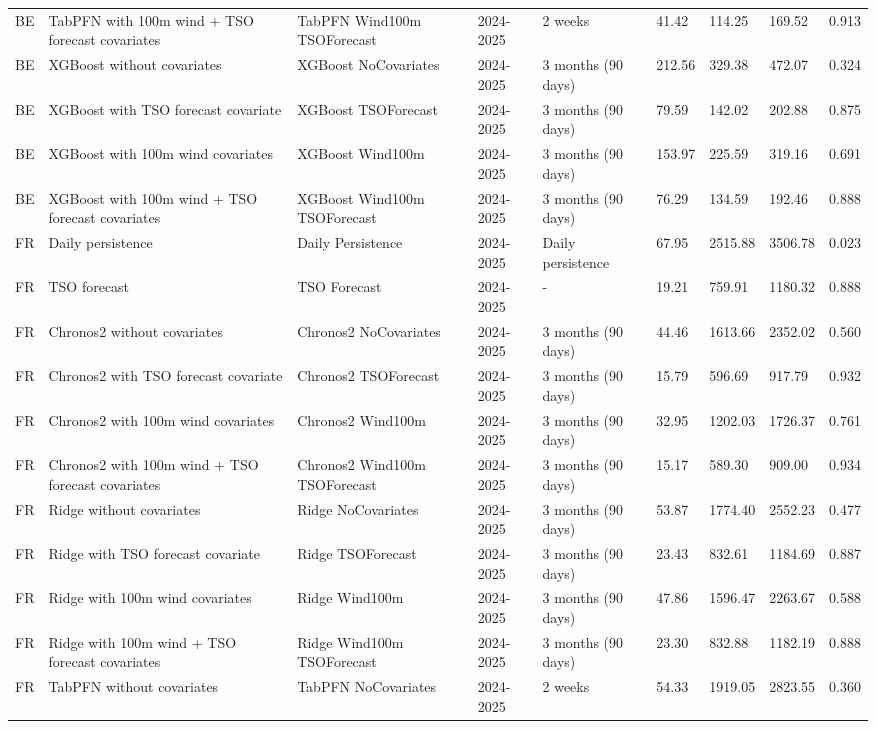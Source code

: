 \begin{longtable}{lllllllll}
BE & TabPFN with 100m wind + TSO forecast covariates & TabPFN Wind100m TSOForecast & 2024-2025 & 2 weeks & 41.42 & 114.25 & 169.52 & 0.913 \\
BE & XGBoost without covariates & XGBoost NoCovariates & 2024-2025 & 3 months (90 days) & 212.56 & 329.38 & 472.07 & 0.324 \\
BE & XGBoost with TSO forecast covariate & XGBoost TSOForecast & 2024-2025 & 3 months (90 days) & 79.59 & 142.02 & 202.88 & 0.875 \\
BE & XGBoost with 100m wind covariates & XGBoost Wind100m & 2024-2025 & 3 months (90 days) & 153.97 & 225.59 & 319.16 & 0.691 \\
BE & XGBoost with 100m wind + TSO forecast covariates & XGBoost Wind100m TSOForecast & 2024-2025 & 3 months (90 days) & 76.29 & 134.59 & 192.46 & 0.888 \\
FR & Daily persistence & Daily Persistence & 2024-2025 & Daily persistence & 67.95 & 2515.88 & 3506.78 & 0.023 \\
FR & TSO forecast & TSO Forecast & 2024-2025 & - & 19.21 & 759.91 & 1180.32 & 0.888 \\
FR & Chronos2 without covariates & Chronos2 NoCovariates & 2024-2025 & 3 months (90 days) & 44.46 & 1613.66 & 2352.02 & 0.560 \\
FR & Chronos2 with TSO forecast covariate & Chronos2 TSOForecast & 2024-2025 & 3 months (90 days) & 15.79 & 596.69 & 917.79 & 0.932 \\
FR & Chronos2 with 100m wind covariates & Chronos2 Wind100m & 2024-2025 & 3 months (90 days) & 32.95 & 1202.03 & 1726.37 & 0.761 \\
FR & Chronos2 with 100m wind + TSO forecast covariates & Chronos2 Wind100m TSOForecast & 2024-2025 & 3 months (90 days) & 15.17 & 589.30 & 909.00 & 0.934 \\
FR & Ridge without covariates & Ridge NoCovariates & 2024-2025 & 3 months (90 days) & 53.87 & 1774.40 & 2552.23 & 0.477 \\
FR & Ridge with TSO forecast covariate & Ridge TSOForecast & 2024-2025 & 3 months (90 days) & 23.43 & 832.61 & 1184.69 & 0.887 \\
FR & Ridge with 100m wind covariates & Ridge Wind100m & 2024-2025 & 3 months (90 days) & 47.86 & 1596.47 & 2263.67 & 0.588 \\
FR & Ridge with 100m wind + TSO forecast covariates & Ridge Wind100m TSOForecast & 2024-2025 & 3 months (90 days) & 23.30 & 832.88 & 1182.19 & 0.888 \\
FR & TabPFN without covariates & TabPFN NoCovariates & 2024-2025 & 2 weeks & 54.33 & 1919.05 & 2823.55 & 0.360 \\

\end{longtable}
